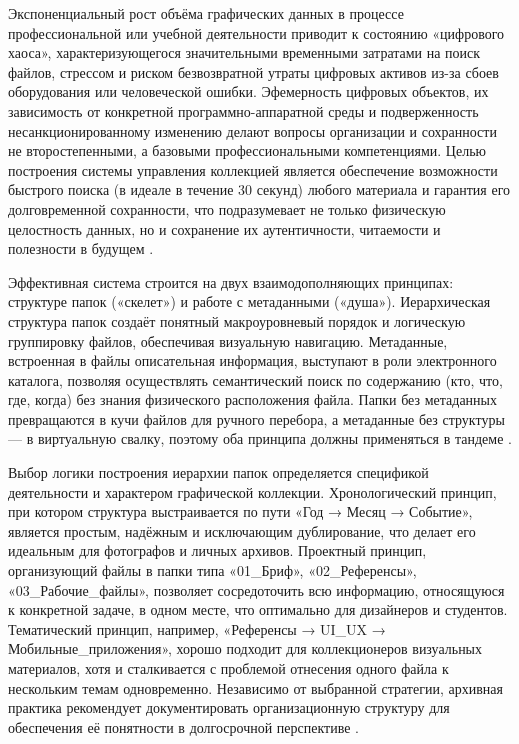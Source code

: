 \documentclass{SibFU-docs}
\begin{document}
Экспоненциальный рост объёма графических данных в процессе профессиональной или учебной деятельности приводит к состоянию «цифрового хаоса», характеризующегося значительными временными затратами на поиск файлов, стрессом и риском безвозвратной утраты цифровых активов из-за сбоев оборудования или человеческой ошибки. Эфемерность цифровых объектов, их зависимость от конкретной программно-аппаратной среды и подверженность несанкционированному изменению делают вопросы организации и сохранности не второстепенными, а базовыми профессиональными компетенциями. Целью построения системы управления коллекцией является обеспечение возможности быстрого поиска (в идеале в течение 30 секунд) любого материала и гарантия его долговременной сохранности, что подразумевает не только физическую целостность данных, но и сохранение их аутентичности, читаемости и полезности в будущем \cite{oais_reference_model}.

Эффективная система строится на двух взаимодополняющих принципах: структуре папок («скелет») и работе с метаданными («душа»). Иерархическая структура папок создаёт понятный макроуровневый порядок и логическую группировку файлов, обеспечивая визуальную навигацию. Метаданные, встроенная в файлы описательная информация, выступают в роли электронного каталога, позволяя осуществлять семантический поиск по содержанию (кто, что, где, когда) без знания физического расположения файла. Папки без метаданных превращаются в кучи файлов для ручного перебора, а метаданные без структуры — в виртуальную свалку, поэтому оба принципа должны применяться в тандеме \cite{principles_archival_description}.


Выбор логики построения иерархии папок определяется спецификой деятельности и характером графической коллекции. Хронологический принцип, при котором структура выстраивается по пути «Год → Месяц → Событие», является простым, надёжным и исключающим дублирование, что делает его идеальным для фотографов и личных архивов. Проектный принцип, организующий файлы в папки типа «01\_Бриф», «02\_Референсы», «03\_Рабочие\_файлы», позволяет сосредоточить всю информацию, относящуюся к конкретной задаче, в одном месте, что оптимально для дизайнеров и студентов. Тематический принцип, например, «Референсы → UI\_UX → Мобильные\_приложения», хорошо подходит для коллекционеров визуальных материалов, хотя и сталкивается с проблемой отнесения одного файла к нескольким темам одновременно. Независимо от выбранной стратегии, архивная практика рекомендует документировать организационную структуру для обеспечения её понятности в долгосрочной перспективе \cite{principles_archival_description}.
\end{document}
